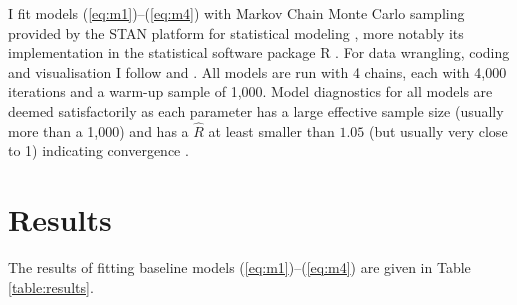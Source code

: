 \documentclass[11pt,parskip,abstracton,notitlepage, dvipsnames]{scrartcl}
\begin{document}
I fit models (\ref{eq:m1})--(\ref{eq:m4}) with Markov Chain Monte Carlo sampling provided by the STAN platform for statistical modeling \citep{gelman2015stan}, more notably its implementation in the statistical software package R \citep{r2021, rstan2020}. For data wrangling, coding and visualisation I follow \citet{mcelreath2020statistical} and \citet{kurzStatisticalRethinkingSecondEd2021}. All models are run with 4 chains, each with 4,000 iterations and a warm-up sample of 1,000. Model diagnostics for all models are deemed satisfactorily as each parameter has a large effective sample size (usually more than a 1,000) and has a $\widehat{R}$ at least smaller than $1.05$ (but usually very close to 1) indicating convergence \citep{vehtari2019rank}.

\section{Results}

The results of fitting baseline models (\ref{eq:m1})--(\ref{eq:m4}) are given in Table \ref{table:results}. 
\end{document}
